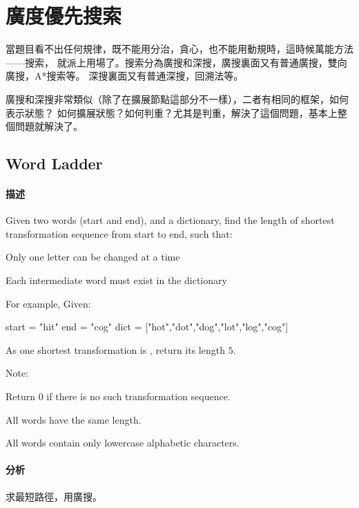 \chapter{廣度優先搜索}
當題目看不出任何規律，既不能用分治，貪心，也不能用動規時，這時候萬能方法——搜索，
就派上用場了。搜索分為廣搜和深搜，廣搜裏面又有普通廣搜，雙向廣搜，A*搜索等。
深搜裏面又有普通深搜，回溯法等。

廣搜和深搜非常類似（除了在擴展節點這部分不一樣），二者有相同的框架，如何表示狀態？
如何擴展狀態？如何判重？尤其是判重，解決了這個問題，基本上整個問題就解決了。
\newline


\section{Word Ladder} %
\label{sec:word-ladder}


\subsubsection{描述}
Given two words (start and end), and a dictionary, find the length of shortest transformation sequence from start to end, such that:
\begindot
\item Only one letter can be changed at a time
\item Each intermediate word must exist in the dictionary
\myenddot

For example, Given:

\begin{Code}
start = "hit"
end = "cog"
dict = ["hot","dot","dog","lot","log","cog"]
\end{Code}
As one shortest transformation is , return its length $5$.

Note:
\begindot
\item Return 0 if there is no such transformation sequence.
\item All words have the same length.
\item All words contain only lowercase alphabetic characters.
\myenddot


\subsubsection{分析}
求最短路徑，用廣搜。

